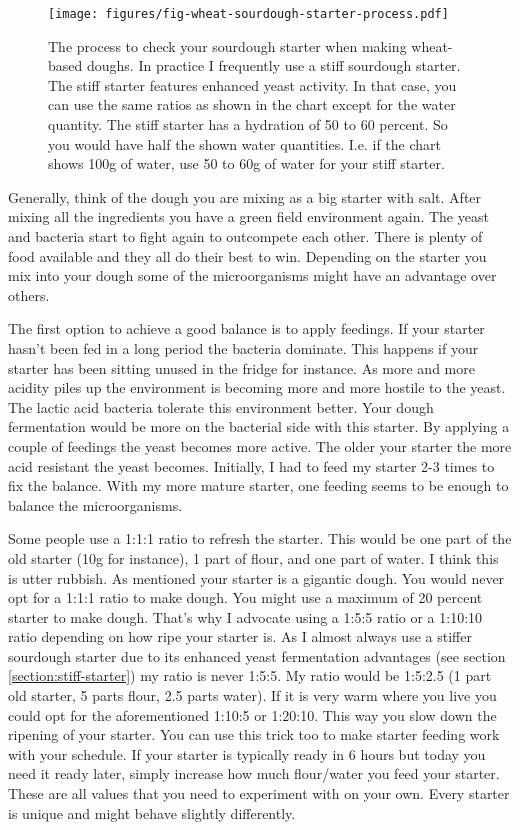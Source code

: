 \begin{figure}[!htb]
  \texttt{[image: figures/fig-wheat-sourdough-starter-process.pdf]}
  \caption{The process to check your sourdough starter when making wheat-based doughs. In practice
  I frequently use a stiff sourdough starter. The stiff starter features enhanced yeast activity. In that case, you can
  use the same ratios as shown in the chart except for the water quantity. The stiff starter has a hydration of 50 to
  60 percent. So you would have half the shown water quantities. I.e. if the chart shows 100g of water, use 50 to 60g of water
  for your stiff starter.}
  \label{fig:process-starter-wheat-sourdough}
\end{figure}

Generally, think of the dough you are mixing as a big starter with salt.
After mixing all the ingredients you have a green field environment again.
The yeast and bacteria start to fight again to outcompete each other.
There is plenty of food available and they all do their best to win.
Depending on the starter you mix into your dough some of the microorganisms
might have an advantage over others.

The first option to achieve a good balance is to apply feedings.
If your starter hasn't been fed in a long period the
bacteria dominate. This happens if your starter has been
sitting unused in the fridge for instance. As more and more
acidity piles up the environment is becoming more and more hostile
to the yeast. The lactic acid bacteria tolerate this environment
better. Your dough fermentation would be more on the
bacterial side with this starter. By applying a couple of
feedings the yeast becomes more active. The older your
starter the more acid resistant the yeast becomes. Initially,
I had to feed my starter 2-3 times to fix the balance. With my
more mature starter, one feeding seems to be enough to balance
the microorganisms.

Some people use a 1:1:1 ratio to refresh the starter. This would
be one part of the old starter (10g for instance), 1 part of flour,
and one part of water. I think this is utter rubbish. As mentioned
your starter is a gigantic dough. You would never opt for a 1:1:1 ratio to
make dough. You might use a maximum of 20 percent starter to
make dough. That's why I advocate using a 1:5:5 ratio or a
1:10:10 ratio depending on how ripe your starter is. As I almost
always use a stiffer sourdough starter due to its enhanced
yeast fermentation advantages (see section \ref{section:stiff-starter})
my ratio is never 1:5:5. My ratio would be 1:5:2.5 (1 part old starter,
5 parts flour, 2.5 parts water). If it is very warm where you live
you could opt for the aforementioned 1:10:5 or 1:20:10. This
way you slow down the ripening of your starter. You can use this
trick too to make starter feeding work with your schedule.
If your starter is typically ready in 6 hours but today you need it
ready later, simply increase how much flour/water you feed your starter.
These are all values that you need to experiment with on your own.
Every starter is unique and might behave slightly differently.

